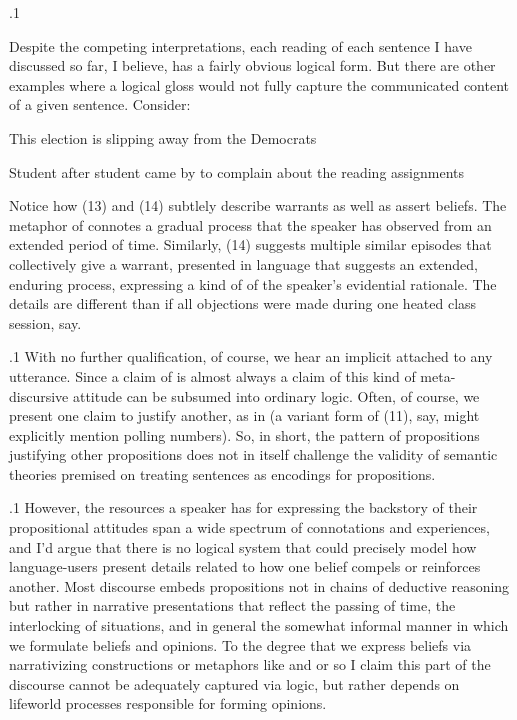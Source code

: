 \documentclass[11pt, twocolumn]{article}
\begin{document}
\p.1{%
Despite the competing interpretations, each reading of each sentence I have discussed so
far, I believe, has a fairly obvious logical form.  But there are other examples where a logical
gloss would not fully capture the communicated content of a given sentence.  Consider:

\begin{exsGroup}

\exsItem{}   This election is slipping away from the Democrats

\exsItem{}   Student after student came by to complain about the reading assignments

\end{exsGroup}

\nip
Notice how \exsRef(13) and \exsRef(14) subtlely describe warrants as well as assert beliefs.
The metaphor of  connotes a
gradual process that the speaker has observed from an extended period of time.  Similarly,
\exsRef(14) suggests multiple similar episodes that collectively give a warrant,
presented in language that suggests an extended,
enduring process, expressing a kind of  of the speaker's evidential
rationale.  The details are different than if all objections were made during one
heated class session, say.
} %

\p.1{%
With no further qualification, of course, we
hear an implicit  attached to any utterance.  Since a
claim of  is almost always a claim of  this kind of
meta-discursive attitude can be subsumed into ordinary logic.
Often, of course, we present one claim to justify another, as in
(a variant form of \exsRef(11), say, might explicitly mention polling numbers).
So, in short, the pattern of propositions justifying other propositions
does not in itself challenge the validity of semantic theories
premised on treating sentences as encodings for propositions.
} %

\p.1{%
However, the resources a speaker has for expressing the backstory of their
propositional attitudes span a wide spectrum of connotations and experiences,
and I'd argue that there is no logical system that could precisely model
how language-users present details related to how one belief compels
or reinforces another.  Most discourse embeds propositions not in
chains of deductive reasoning but rather in narrative presentations
that reflect the passing of time, the interlocking of situations, and
in general the somewhat informal manner in which
we formulate beliefs and opinions.  To the degree that we
express beliefs via narrativizing constructions or metaphors like
 and  \mdash{} or so I claim \mdash{} this
part of the discourse cannot be adequately captured via logic, but
rather depends on lifeworld processes responsible for forming opinions.
} %
\end{document}
